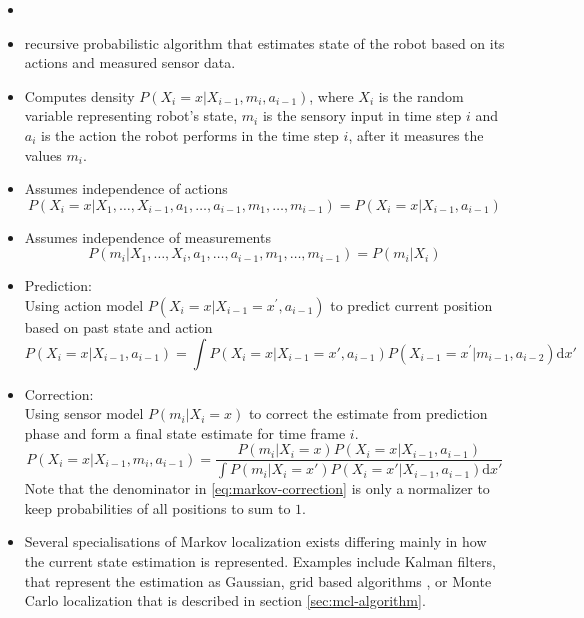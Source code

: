 \begin{itemize}
\item \cite{fox98,diard}
\item recursive probabilistic algorithm that estimates state of the robot based
	on its actions and measured sensor data.
\item Computes density \(P(X_i = x | X_{i-1}, m_i, a_{i - 1})\),
	where \(X_i\) is the random variable representing robot's state,
	\(m_i\) is the sensory input in time step \(i\) and \(a_i\) is the action the
	robot performs in the time step \(i\), after it measures the values \(m_i\).
\item Assumes independence of actions
	\begin{equation}
		P(X_i = x | X_1, \dotsc, X_{i - 1}, a_1, \dotsc, a_{i - 1},
		m_1, \dotsc, m_{i - 1}) = 
		P(X_i = x | X_{i - 1}, a_{i - 1})
	\end{equation}
\item Assumes independence of measurements
	\begin{equation}
		P(m_i | X_1, \dotsc, X_i, a_1, \dotsc, a_{i - 1},
		m_1, \dotsc, m_{i - 1}) = 
		P(m_i | X_i)
	\end{equation}
\item Prediction:\\
	Using action model \(P(X_i = x | X_{i-1} = x^\prime, a_{i - 1})\) to predict
	current position based on past state and action
	\begin{equation}
		\label{eq:markov-prediction}
		P(X_i = x | X_{i - 1}, a_{i - 1}) =
		\int
		P(X_i = x | X_{i - 1} = x', a_{i - 1})
		P(X_{i - 1} = x^\prime | m_{i - 1}, a_{i - 2})
		\mathrm{d}x'
	\end{equation}

\item Correction:\\
	Using sensor model \(P(m_i | X_i = x)\) to correct the estimate from prediction phase
	and form a final state estimate for time frame \(i\).
	\begin{equation}
		\label{eq:markov-correction}
		P(X_i = x | X_{i-1}, m_i, a_{i - 1}) =
		\frac
			{P(m_i | X_i = x) P(X_i = x | X_{i - 1}, a_{i - 1})}
			{
			\int
			P(m_i | X_i = x') P(X_i = x' | X_{i - 1}, a_{i - 1})
			\mathrm{d}x'
			}
	\end{equation}
	Note that the denominator in \eqref{eq:markov-correction} is only a normalizer to
	keep probabilities of all positions to sum to \(1\). 
\item Several specialisations of Markov localization exists differing mainly in how the
	current state estimation is represented.
	Examples include Kalman filters, that represent the estimation as Gaussian,
	grid based algorithms \cite{fox98}, or Monte Carlo localization
	that is described in section \ref{sec:mcl-algorithm}.
\end{itemize}

